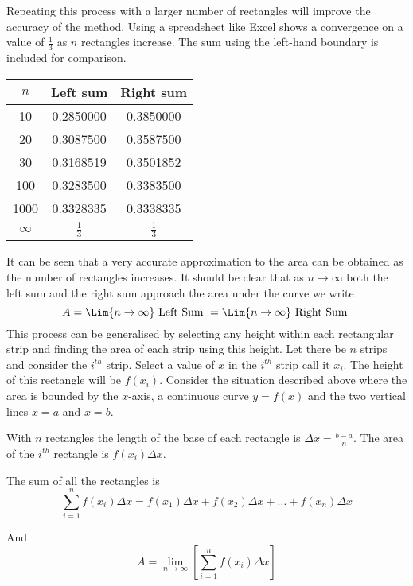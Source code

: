 Repeating this process with a larger number of rectangles will improve the accuracy of the method. Using a spreadsheet like Excel shows a convergence on a value of $\frac{1}{3}$ as $n$ rectangles increase. The sum using the left-hand boundary is included for comparison.
\begin{center}
	\begin{tabular}[c]{ccc}\toprule
		$n$  & Left sum  & Right sum  \\\midrule
		10		& 0.2850000  & 0.3850000  \\\midrule
		20		& 0.3087500  & 0.3587500  \\\midrule
		30		& 0.3168519  & 0.3501852  \\\midrule
		100		& 0.3283500  & 0.3383500  \\\midrule
		1000	& 0.3328335  & 0.3338335  \\\midrule
		$\infty$& $\frac{1}{3}$&$\frac{1}{3}$\\\bottomrule
\end{tabular}\end{center}
It can be seen that a very accurate approximation to the area can be obtained as the number of rectangles increases. It should be clear that as $n \rightarrow \infty $ both the left sum and the right sum approach the area under the curve we write
\begin{equation*}A =\Lim{n \to \infty}\text{ Left Sum } =\Lim{n \to \infty}\text{ Right Sum }
\end{equation*}
This process can be generalised by selecting any height within each rectangular strip
and finding the area of each strip using this height. Let there be $n$ strips and consider the $i^{t h}$ strip. Select a value of $x$ in the $i^{t h}$ strip call it $x_{i}$. The height of this rectangle will be $f (x_{i})$. Consider the situation described above where the area is bounded by the $x$-axis, a continuous curve $y =f (x)$ and the two vertical lines $x =a$ and $x =b$. 

With $n$ rectangles the length of the base of each rectangle is $ \Delta x =\frac{b -a}{n}$. The area of the $i^{t h}$ rectangle is $f (x_{i})  \Delta x$.

The sum of all the rectangles is
\begin{equation*}\underset{i =1}{\sum ^{n}} f (x_{i})  \Delta x =f \left (x_{1}\right )  \Delta x +f \left (x_{2}\right )  \Delta x +\ldots  +f \left (x_{n}\right )  \Delta x
\end{equation*}

And
\begin{equation*}A =\underset{n \rightarrow \infty }{\lim }\left [\underset{i =1}{\sum ^{n}} f (x_{i})  \Delta x\right ]
\end{equation*}

